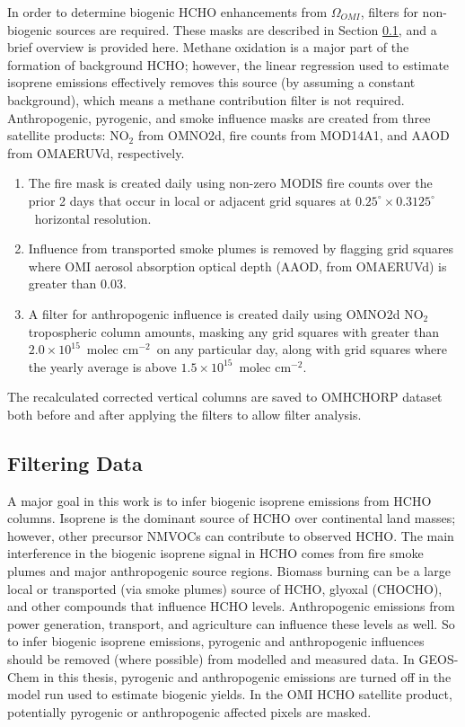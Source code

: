 \documentclass[acp, manuscript]{copernicus}
\newcommand{\Oomi}{\Omega_{OMI}} %
\newcommand{\moleccm}{~molec cm$^{-2}$}
\newcommand{\highhr}{$0.25^{\circ} \times 0.3125^{\circ}$}
\begin{document}
    In order to determine biogenic HCHO enhancements from $\Oomi$, filters for non-biogenic sources are required.
    These masks are described in Section \ref{Model:filter}, and a brief overview is provided here.
    Methane oxidation is a major part of the formation of background HCHO; however, the linear regression used to estimate isoprene emissions effectively removes this source (by assuming a constant background), which means a methane contribution filter is not required.
    Anthropogenic, pyrogenic, and smoke influence masks are created from three satellite products: NO$_2$ from OMNO2d, fire counts from MOD14A1, and AAOD from OMAERUVd, respectively.
    \begin{enumerate}
      \item 
      The fire mask is created daily using non-zero MODIS fire counts over the prior 2 days that occur in local or adjacent grid squares at \highhr ~horizontal resolution.
      \item 
      Influence from transported smoke plumes is removed by flagging grid squares where OMI aerosol absorption optical depth (AAOD, from OMAERUVd) is greater than 0.03.
      \item 
      A filter for anthropogenic influence is created daily using OMNO2d NO$_2$ tropospheric column amounts, masking any grid squares with greater than $2.0 \times 10^{15}$\moleccm ~on any particular day, along with grid squares where the yearly average is above $1.5 \times 10^{15}$\moleccm.
    \end{enumerate}
    The recalculated corrected vertical columns are saved to OMHCHORP dataset both before and after applying the filters to allow filter analysis.
  
  
  
  \subsection{Filtering Data}
  \label{Model:filter}
  
  A major goal in this work is to infer biogenic isoprene emissions from HCHO columns.
  Isoprene is the dominant source of HCHO over continental land masses; however, other precursor NMVOCs can contribute to observed HCHO.
  The main interference in the biogenic isoprene signal in HCHO comes from fire smoke plumes and major anthropogenic source regions.
  Biomass burning can be a large local or transported (via smoke plumes) source of HCHO, glyoxal (CHOCHO), and other compounds that influence HCHO levels.
  Anthropogenic emissions from power generation, transport, and agriculture can influence these levels as well.
  So to infer biogenic isoprene emissions, pyrogenic and anthropogenic influences should be removed (where possible) from modelled and measured data.
  In GEOS-Chem in this thesis, pyrogenic and anthropogenic emissions are turned off in the model run used to estimate biogenic yields.
  In the OMI HCHO satellite product, potentially pyrogenic or anthropogenic affected pixels are masked.
  
\end{document}
